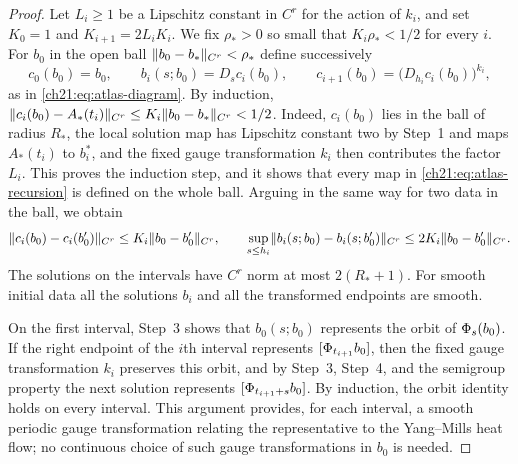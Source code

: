 \begin{proof}
Let $L_i\ge1$ be a Lipschitz constant in $C^r$ for the action of $k_i$, and set $K_0=1$ and $K_{i+1}=2L_iK_i$. We fix $\rho_*>0$ so small that $K_i\rho_*<1/2$ for every $i$. For $b_0$ in the open ball $\lVert b_0-b_*\rVert_{C^r}<\rho_*$ define successively
\begin{equation}\label{ch21:eq:atlas-recursion}
 c_0(b_0)=b_0,\qquad b_i(s;b_0)=D_sc_i(b_0),\qquad c_{i+1}(b_0)=\bigl(D_{h_i}c_i(b_0)\bigr)^{k_i},
\end{equation}
as in \eqref{ch21:eq:atlas-diagram}. By induction, $\lVert c_i(b_0)-A_*(t_i)\rVert_{C^r}\le K_i\lVert b_0-b_*\rVert_{C^r}<1/2$. Indeed, $c_i(b_0)$ lies in the ball of radius $R_*$, the local solution map has Lipschitz constant two by Step~1 and maps $A_*(t_i)$ to $b_i^*$, and the fixed gauge transformation $k_i$ then contributes the factor $L_i$. This proves the induction step, and it shows that every map in \eqref{ch21:eq:atlas-recursion} is defined on the whole ball. Arguing in the same way for two data in the ball, we obtain
\[
 \lVert c_i(b_0)-c_i(b_0')\rVert_{C^r}\le K_i\lVert b_0-b_0'\rVert_{C^r},\qquad
 \sup_{s\le h_i}\lVert b_i(s;b_0)-b_i(s;b_0')\rVert_{C^r}\le2K_i\lVert b_0-b_0'\rVert_{C^r}.
\]
The solutions on the intervals have $C^r$ norm at most $2(R_*+1)$. For smooth initial data all the solutions $b_i$ and all the transformed endpoints are smooth.

On the first interval, Step~3 shows that $b_0(s;b_0)$ represents the orbit of $\Phi_s(b_0)$. If the right endpoint of the $i$th interval represents $[\Phi_{t_{i+1}}b_0]$, then the fixed gauge transformation $k_i$ preserves this orbit, and by Step~3, Step~4, and the semigroup property the next solution represents $[\Phi_{t_{i+1}+s}b_0]$. By induction, the orbit identity holds on every interval. This argument provides, for each interval, a smooth periodic gauge transformation relating the representative to the Yang--Mills heat flow; no continuous choice of such gauge transformations in $b_0$ is needed.


\end{proof}
